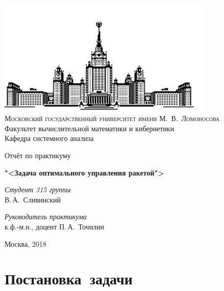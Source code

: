 \documentclass[11pt, oneside, final]{article}
\theoremstyle{break}
\numberwithin{equation}{section}
\theoremstyle{plain}
\theoremstyle{definition}
\begin{document}
    \thispagestyle{empty}
    \begin{center}
        \ \vspace{-3cm}
    
        \includegraphics[width=0.5
        \textwidth]{msu}\\
        {\scshape Московский государственный университет имени М.~В.~Ломоносова}\\
        Факультет вычислительной математики и кибернетики\\
        Кафедра системного анализа
    
        \vfill
    
        {\LARGE Отчёт по практикуму}
    
        \vspace{1cm}
    
        {\Huge\bfseries "<Задача оптимального управления ракетой">} 
    \end{center}

    \vspace{3cm}
    \begin{flushright}
        \large \textit{Студент 315 группы}\\
        В.\,А.~Сливинский
    
        \vspace{5mm}
    
        \textit{Руководитель практикума}\\
        к.ф.-м.н., доцент П.\,А.~Точилин 
    \end{flushright}

    \vfill
    \begin{center}
        Москва, 2018 
    \end{center}
    \pagebreak

    \tableofcontents

    \pagebreak



    \section{Постановка~задачи}
    \label{sec:task}
\end{document}
